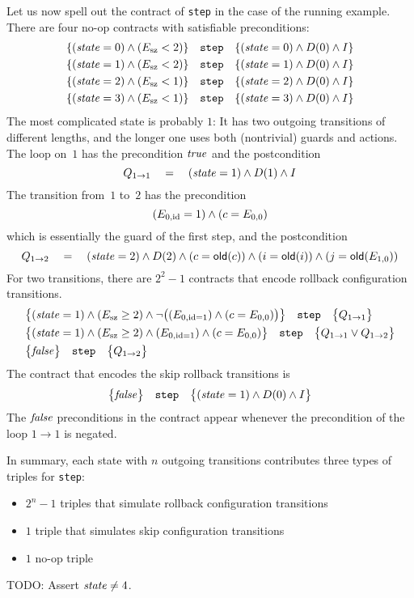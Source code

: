 \documentclass{article} %
\begin{document}
Let us now spell out the contract of {\tt step} in the case of the running example.
There are four no-op contracts with satisfiable preconditions:
\begin{align*}
\{({\it state}=0)\land(E_{\rm sz}<2)\} \quad\text{\tt step}\quad
  \{({\it state}=0)\land D(0)\land I\} \\
\{({\it state}=1)\land(E_{\rm sz}<2)\} \quad\text{\tt step}\quad
  \{({\it state}=1)\land D(0)\land I\} \\
\{({\it state}=2)\land(E_{\rm sz}<1)\} \quad\text{\tt step}\quad
  \{({\it state}=2)\land D(0)\land I\} \\
\{({\it state}=3)\land(E_{\rm sz}<1)\} \quad\text{\tt step}\quad
  \{({\it state}=3)\land D(0)\land I\}
\end{align*}
The most complicated state is probably $1$:
It has two outgoing transitions of different lengths, and the longer one uses both (nontrivial) guards and actions.
The loop on~$1$ has the precondition ${\it true}$ and the postcondition
\[ Q_{1\to1} \quad=\quad ({\it state}=1) \land D(1) \land I \]
The transition from~$1$ to~$2$ has the precondition
\[ (E_{0,{\rm id}}=1)\land(c=E_{0,0}) \]
which is essentially the guard of the first step, and the postcondition
\[ Q_{1\to2} \quad=\quad
({\it state}=2)\land D(2)\land (c={\sf old}(c))\land (i={\sf old}(i))
  \land (j={\sf old}(E_{1,0}))\]
For two transitions, there are $2^2-1$ contracts that encode rollback configuration transitions.
\begin{align*}
&\bigl\{({\it state}=1)\land(E_{\rm sz}\ge2)\land
  \lnot\bigl((E_{0,{\rm id}=1})\land(c=E_{0,0})\bigr)\bigr\}
  \quad\text{\tt step}\quad
  \bigl\{Q_{1\to1}\bigr\} \\
&\bigl\{({\it state}=1)\land(E_{\rm sz}\ge2)\land
  (E_{0,{\rm id}=1})\land(c=E_{0,0})\bigr\}
  \quad\text{\tt step}\quad
  \bigl\{Q_{1\to1}\lor Q_{1\to2}\bigr\} \\
&\bigl\{{\it false}\bigr\}\quad\text{\tt step}\quad\bigl\{Q_{1\to2}\bigr\}
\end{align*}
The contract that encodes the skip rollback transitions is
\[ \bigl\{{\it false}\bigr\}\quad\text{\tt step}\quad
  \bigl\{({\it state}=1)\land D(0)\land I\bigr\} \]
The ${\it false}$ preconditions in the contract appear whenever the precondition of the loop $1\to1$ is negated.

In summary, each state with $n$ outgoing transitions contributes three types of triples for {\tt step}:
\begin{itemize}
\item $2^n-1$ triples that simulate rollback configuration transitions
\item $1$ triple that simulates skip configuration transitions
\item $1$ no-op triple
\end{itemize}

TODO: Assert ${\it state}\ne4$.
\end{document}
